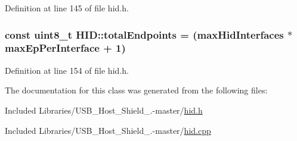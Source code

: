 \-Definition at line 145 of file hid.\-h.

\hypertarget{class_h_i_d_a884aa67312324e7d23a052a6dc80337e}{
\subsubsection[{total\-Endpoints}]{\setlength{\rightskip}{0pt plus 5cm}const uint8\-\_\-t {\bf \-H\-I\-D\-::total\-Endpoints} = ({\bf max\-Hid\-Interfaces} $\ast$ {\bf max\-Ep\-Per\-Interface} + 1)}}\label{class_h_i_d_a884aa67312324e7d23a052a6dc80337e}


\-Definition at line 154 of file hid.\-h.



\-The documentation for this class was generated from the following files\-:\begin{DoxyCompactItemize}
\item 
\-Included Libraries/\-U\-S\-B\-\_\-\-Host\-\_\-\-Shield\-\_.-\/master/\hyperlink{hid_8h}{hid.\-h}\item 
\-Included Libraries/\-U\-S\-B\-\_\-\-Host\-\_\-\-Shield\-\_.-\/master/\hyperlink{hid_8cpp}{hid.\-cpp}\end{DoxyCompactItemize}
